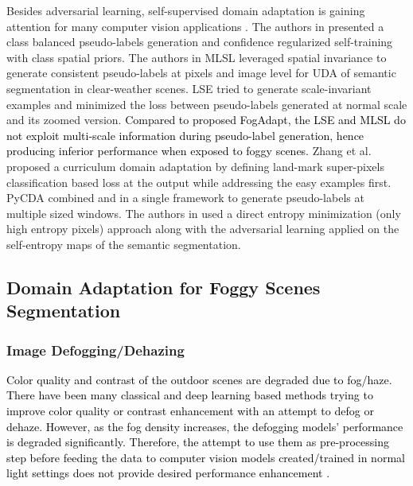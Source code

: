 \documentclass[final,5p,times,twocolumn]{elsarticle}
\begin{document}
Besides adversarial learning, self-supervised domain adaptation is gaining attention for many computer vision applications \cite{zou2018unsupervised, mlsl2020, khodabandeh2019robust}. The authors in \cite{zou2018unsupervised, zou2019crst} presented a class balanced pseudo-labels generation and confidence regularized self-training with class spatial priors.
The authors in  MLSL \cite{mlsl2020} leveraged spatial invariance to generate consistent pseudo-labels at pixels and image level for UDA of semantic segmentation in clear-weather scenes.
LSE \cite{LSE_2020_Naseer} tried to generate scale-invariant examples and minimized the loss between pseudo-labels generated at normal scale and its zoomed version. 
\textcolor{black}{Compared to proposed FogAdapt, the LSE \cite{LSE_2020_Naseer} and MLSL \cite{mlsl2020} do not exploit multi-scale information during pseudo-label generation, hence producing inferior performance when exposed to foggy scenes.} 
Zhang et al. \cite{zhang2019curriculum} proposed a curriculum domain adaptation by defining land-mark super-pixels classification based loss at the output while addressing the easy examples first. PyCDA \cite{Lian_2019_pycda} combined \cite{zou2018unsupervised} and \cite{zhang2019curriculum} in a single framework to generate pseudo-labels at multiple sized windows.
The authors in \cite{vu2019advent} used a direct entropy minimization (only high entropy pixels) approach along with the adversarial learning applied on the self-entropy maps of the semantic segmentation. 





\subsection{Domain Adaptation for Foggy Scenes Segmentation}


\subsubsection{Image Defogging/Dehazing}
\textcolor{black}{Color quality and contrast of the outdoor scenes are degraded due to fog/haze. There have been many classical \cite{he2010single, kim2011single, kim2013optimized, ancuti2014effective} and deep learning  \cite{chen2019gated, morales2019feature, golts2019unsupervised, du2018recursive, kim2019bidirectional, liu2019physics} based methods trying to improve color quality or contrast enhancement with an attempt to defog or dehaze. However, as the fog density increases, the defogging models' performance is degraded significantly. Therefore, the attempt to use them as pre-processing step before feeding the data to computer vision models created/trained in normal light settings does not provide desired performance enhancement \cite{pei2018does}.}
\end{document}
